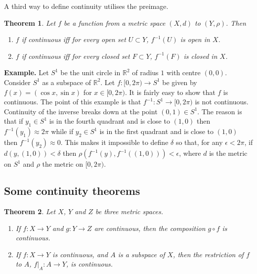 \documentclass[two column]{article}
\newtheorem{theorem}{Theorem}[subsection]
\begin{document}
A third way to define continuity utilises the preimage. \\

\begin{theorem}
Let $f$ be a function from a metric space $(X,d)$ to $(Y,\rho)$. Then
\begin{enumerate}
\item $f$ if continuous iff for every open set $U \subset Y$, $f^{-1}(U)$ is open in $X$. 
\item $f$ if continuous iff for every closed set $F \subset Y$, $f^{-1}(F)$ is closed in $X$. \vspace{6pt}
\end{enumerate}
\end{theorem}

{\bf Example.} Let $S^{1}$ be the unit circle in $\mathbb{R}^{2}$ of radius $1$ with centre $(0,0)$. Consider $S^{1}$ as a subspace of $\mathbb{R}^{2}$. Let $f : [0, 2\pi) \rightarrow S^{1}$ be given by $f(x) = (\cos x, \sin x)$ for $x \in [0, 2\pi )$. It is fairly easy to show that $f$ is continuous. The point of this example is that $f^{-1}: S^{1} \rightarrow [0, 2\pi)$ is not continuous. Continuity of the inverse breaks down at the point $(0,1) \in S^{1}$. The reason is that if $y_{1} \in S^{1}$ is in the fourth quadrant and is close to $(1,0)$ then $f^{-1}(y_{1}) \approx 2\pi$ while if $y_{2} \in S^{1}$ is in the first quadrant and is close to $(1,0)$ then $f^{-1}(y_{2}) \approx 0$. This makes it impossible to define $\delta$ so that, for any $\epsilon < 2\pi$, if $d(y, (1,0)) < \delta$ then $\rho(f^{-1}(y), f^{-1}((1,0))) < \epsilon$, where $d$ is the metric on $S^{1}$ and $\rho$ the metric on $[0, 2\pi)$. 

\subsection{Some continuity theorems}

\begin{theorem}
Let $X$, $Y$ and $Z$ be three metric spaces. 
\begin{enumerate}
\item If $f:X \rightarrow Y$ and $g: Y \rightarrow Z$ are continuous, then the composition $g \circ f$ is continuous. 
\item If $f:X \rightarrow Y$ is continuous, and $A$ is a subspace of $X$, then the restriction of $f$ to $A$, $f\vert_{A}:A\rightarrow Y$, is continuous. \\
\end{enumerate}
\end{theorem}
\end{document}
